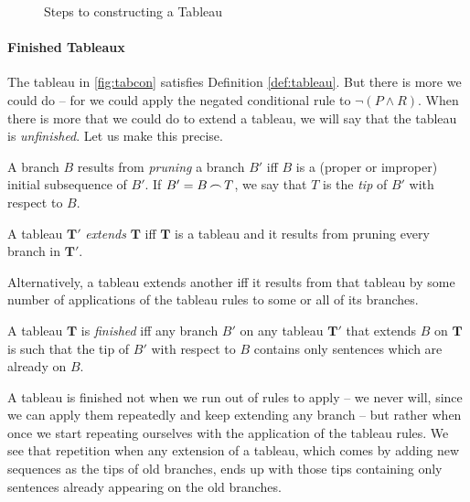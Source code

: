 \begin{figure}
    \centering
{}\qquad
{}\qquad
{}
  \caption{Steps to constructing a Tableau \label{fig:tabcon}}
\end{figure}

\paragraph{Finished Tableaux} The tableau in \autoref{fig:tabcon} satisfies Definition \ref{def:tableau}. But there is more we could do – for we could apply the negated conditional rule to $¬(P \wedge R)$. When there is more that we could do to extend a tableau, we will say that the tableau is \emph{unfinished}. Let us make this precise. \begin{definition}
	A branch $B$ results from \emph{pruning} a branch $B'$ iff $B$ is a (proper or improper) initial subsequence of $B'$. If $B' = B \mathop{\frown} T$, we say that $T$ is the \emph{tip} of $B'$ with respect to $B$.
\end{definition}
\begin{definition}[Extends]
	A tableau $\mathbf{T}'$ \emph{extends} $\mathbf{T}$ iff $\mathbf{T}$ is a tableau and it results from pruning every branch in $\mathbf{T}'$.
\end{definition} Alternatively, a tableau extends another iff it results from that tableau by some number of applications of the tableau rules to some or all of its branches.
\begin{definition}[Finished]
	A tableau $\mathbf{T}$ is \emph{finished} iff any branch $B'$ on any tableau $\mathbf{T}'$ that extends $B$ on $\mathbf{T}$ is such that the tip of $B'$ with respect to $B$ contains only sentences which are already on $B$. 
\end{definition} A tableau is finished not when we run out of rules to apply – we never will, since we can apply them repeatedly and keep extending any branch – but rather when once we start repeating ourselves with the application of the tableau rules. We see that repetition when any extension of a tableau, which comes by adding new sequences as the tips of old branches, ends up with those tips containing only sentences already appearing on the old branches.



